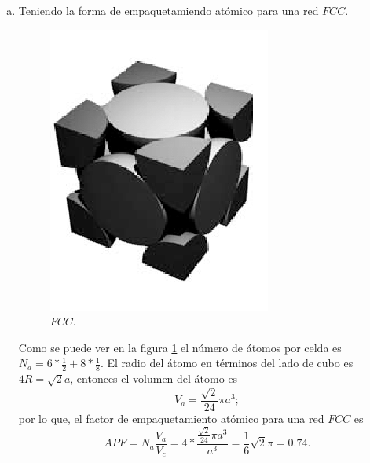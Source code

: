 \begin{enumerate}[(a)]
		$$
			\left.\begin{array}{cc}
				P_1 = (1,0,0) & Q_1 = (0,1,0) \\
				P_2 = (0,0,1) & Q_2 = (0,1,1) \\ 
				P_3 = (0,1,0) & Q_3 = (1,0,0) \\
				 & \\
				P_3 P_1 = (-1,1,0) & Q_3 Q_1 = (1,-1,0) \\
				P_2 P_1 = (-1,0,1) & Q_2 Q_1 = (0,0,1) \\
				\downarrow & \downarrow \\
				P_3 P_1 \cp P_2 P_1 & Q_2 Q_1 \cp Q_3 Q_1 \\
				\downarrow & \downarrow \\
				N_P = (1,1,1) & N_Q = (1,1,0),
			\end{array}\right.
		$$
		Con los vectores normales encontrados, utilizando el producto punto para encontrar el ángulo, se tiene
		$$ \theta = \arccos{\frac{\abs{N_P \cdot N_Q}}{\abs{N_P} \abs{N_Q}}} = 35.26^o . $$
	\item Teniendo la forma de empaquetamiendo atómico para una red $FCC$.
		\begin{figure}[H]
			\centering
			\includegraphics[scale=0.35]{img/fcc.png}
			\caption{$FCC$.}
			\label{fcc}
		\end{figure}
		Como se puede ver en la figura \ref{fcc} el número de átomos por celda es $N_{a} = 6*\frac{1}{2} + 8*\frac{1}{8}$. El radio del átomo en términos del lado de cubo es $4R = \sqrt{2} a$, entonces el volumen del átomo es
			$$ V_a = \frac{\sqrt{2}}{24} \pi a^3; $$
		por lo que, el factor de empaquetamiento atómico para una red $FCC$ es
			$$ APF = N_a \frac{V_a}{V_c} = 4*\frac{\frac{\sqrt{2}}{24} \pi a^3}{a^3} = \frac{1}{6} \sqrt{2} \pi = 0.74. $$

\end{enumerate}
